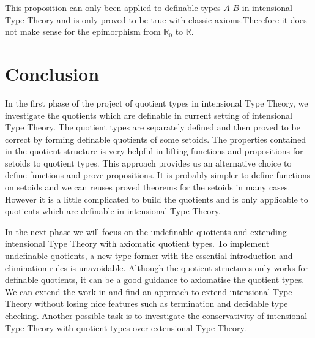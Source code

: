 \documentclass{article}
\theoremstyle{definition}
\newcommand{\R}{\mathbb{R}}
\newcommand{\itt}{intensional Type Theory}
\newcommand{\ett}{extensional Type Theory}
\begin{document}
This proposition can only been applied to definable types $A$ $B$ in \itt{} and is
only proved to be true with classic axioms.Therefore it does not make
sense for the epimorphism from $\R_0$ to $\R$.

\section{Conclusion}

In the first phase of the project of quotient types in \itt{}, we
investigate the quotients which are definable in current setting of
\itt{}. The quotient types are separately defined and then proved to
be correct by forming definable quotients of some setoids. The
properties contained in the quotient structure is very helpful in
lifting functions and propositions for setoids to quotient types. This
approach provides us an alternative choice to define functions and prove propositions. It is probably simpler to define functions on setoids and we can reuses proved theorems for the setoids in many cases. However it is a little complicated to build the quotients and is only applicable to quotients which are definable in \itt{}.

In the next phase we will focus on the undefinable quotients and extending \itt{} with axiomatic quotient types. To implement undefinable quotients, a new type former with the essential introduction and elimination rules is unavoidable. Although the quotient structures only works for definable quotients, it can be a good guidance to axiomatise the quotient types. We can extend the work in \cite{alt:99} and find an approach to extend \itt{} without losing nice features such as termination and decidable type checking. Another possible task is to investigate the conservativity of \itt{} with quotient types over \ett{}.

% 





\newpage


\end{document}
